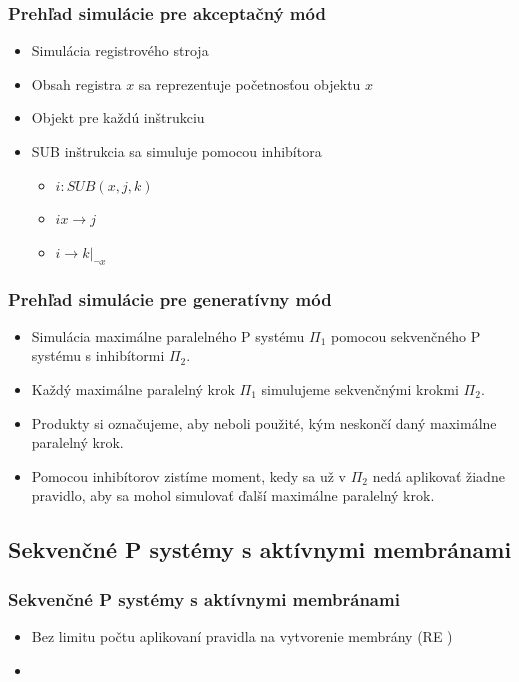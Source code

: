 \begin{frame}[t]\frametitle{Prehľad simulácie pre akceptačný mód}
  \begin{itemize}
    \item Simulácia registrového stroja
    \pause
    \item Obsah registra $x$ sa reprezentuje početnosťou objektu $x$
    \item Objekt pre každú inštrukciu
    \pause
    \item SUB inštrukcia sa simuluje pomocou inhibítora
    \begin{itemize}
      \item $i: SUB(x,j,k)$
      \item $ix\rightarrow j$
      \item $i\rightarrow k|_{\neg{x}}$
    \end{itemize}
  \end{itemize}
\end{frame}
\note{}

\begin{frame}[t]\frametitle{Prehľad simulácie pre generatívny mód}
  \begin{itemize}
    \item Simulácia maximálne paralelného P systému $\Pi_1$ pomocou sekvenčného P systému s inhibítormi $\Pi_2$.
    \pause
    \item Každý maximálne paralelný krok $\Pi_1$ simulujeme sekvenčnými krokmi $\Pi_2$.
    \pause
    \item Produkty si označujeme, aby neboli použité, kým neskončí daný maximálne paralelný krok.
    \pause
    \item Pomocou inhibítorov zistíme moment, kedy sa už v $\Pi_2$ nedá aplikovať žiadne pravidlo, aby sa mohol simulovať ďalší maximálne paralelný krok.
  \end{itemize}
\end{frame}
\note{}


\subsection{Sekvenčné P systémy s aktívnymi membránami} %
\label{sub:sekven_n_p_syst_my_s_akt_vnymi_membr_nami}

\begin{frame}[t]\frametitle{Sekvenčné P systémy s aktívnymi membránami}
  \begin{itemize}
    \item Bez limitu počtu aplikovaní pravidla na vytvorenie membrány (RE \cite{Ibarra05Active})
    \pause
    \item {}
  \end{itemize}

  
\end{frame}

